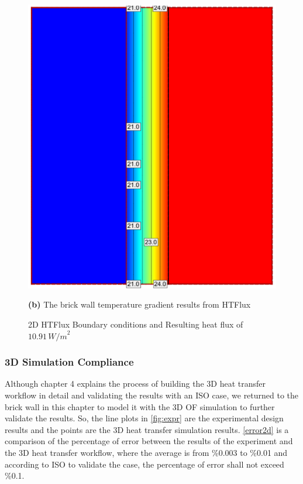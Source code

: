\begin{figure}[H]
\begin{minipage}{0.45\textwidth}
  \includegraphics[width=\linewidth]{Figures/2dsim.png} 
  \caption*{\textbf{(b)} The brick wall temperature gradient results from HTFlux}
\end{minipage}
\caption{2D HTFlux Boundary conditions and Resulting heat flux of \( 10.91 \, {W/m}^2 \)}
\label{2dconst}
\end{figure}


\subsubsection{3D Simulation Compliance}\label{3dbrick}
Although chapter 4 explains the process of building the 3D heat transfer workflow in detail and validating the results with an ISO case, we returned to the brick wall in this chapter to model it with the 3D \gls{OF} simulation to further validate the results. So, the line plots in \ref{fig:expr} are the experimental design results and the points are the 3D heat transfer simulation results. \ref{error2d} is a comparison of the percentage of error between the results of the experiment and the 3D heat transfer workflow, where the average is from \%0.003 to \%0.01 and according to ISO\cite{ISO} to validate the case, the percentage of error shall not exceed \%0.1.


